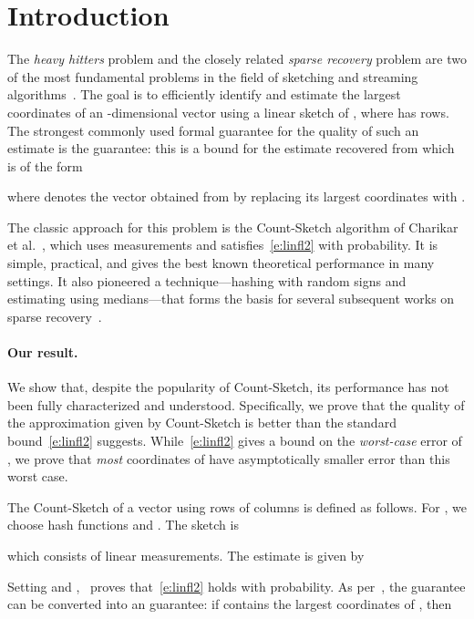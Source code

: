 \documentclass[letterpaper,11pt]{article}
\begin{document}
\section{Introduction}

The \emph{heavy hitters} problem and the closely related \emph{sparse
  recovery} problem are two of the most fundamental problems in the
field of sketching and streaming
algorithms~\cite{CCF02,CM06,GI10,CH10,M05}.  The goal is to
efficiently identify and estimate the  largest coordinates of an
-dimensional vector using a linear sketch  of , where  has  rows.  The strongest commonly
used formal guarantee for the quality of such an estimate is the
 guarantee: this is a bound for the estimate  recovered from  which is of the form

where  denotes the vector obtained from  by replacing
its largest  coordinates with .

The classic approach for this problem is the Count-Sketch algorithm of
Charikar et al.~\cite{CCF02}, which uses 
measurements and satisfies~\eqref{e:linfl2} with 
probability.  It is simple, practical, and gives the best known
theoretical performance in many settings.  It also pioneered a
technique---hashing with random signs and estimating using
medians---that forms the basis for several subsequent works on sparse
recovery~\cite{GLPS,IPW11,HIKP12a,G12}.

\paragraph{Our result.} We show that, despite the popularity of
Count-Sketch, its performance has not been fully characterized and
understood. Specifically, we prove that the quality of the
approximation  given by Count-Sketch is better than the
standard bound~\eqref{e:linfl2} suggests.  While~\eqref{e:linfl2}
gives a bound on the \emph{worst-case} error of , we prove
that \emph{most} coordinates of  have asymptotically smaller
error than this worst case.

The Count-Sketch of a vector  using  rows of 
columns is defined as follows.  For , we choose hash functions  and .  The sketch is

which consists of  linear measurements.  The estimate  is given by

Setting  and ,~\cite{CCF02}
proves that~\eqref{e:linfl2} holds with  probability.
\iffalse
As per~\cite{CM06,GI10}, the  guarantee can be converted
into an  guarantee: if  contains the largest 
coordinates of , then
\end{document}
